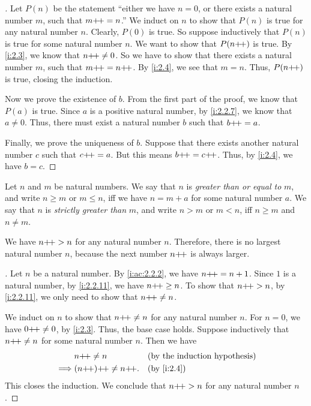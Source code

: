 \begin{proof}[]
  Let \(P(n)\) be the statement ``either we have \(n = 0\), or there exists a natural number \(m\), such that \(m{+}\!{+} = n\).''
  We induct on \(n\) to show that \(P(n)\) is true for any natural number \(n\).
  Clearly, \(P(0)\) is true.
  So suppose inductively that \(P(n)\) is true for some natural number \(n\).
  We want to show that \(P(n{+}\!{+})\) is true.
  By \cref{i:2.3}, we know that \(n{+}\!{+} \neq 0\).
  So we have to show that there exists a natural number \(m\), such that \(m{+}\!{+} = n{+}\!{+}\).
  By \cref{i:2.4}, we see that \(m = n\).
  Thus, \(P(n{+}\!{+})\) is true, closing the induction.

  Now we prove the existence of \(b\).
  From the first part of the proof, we know that \(P(a)\) is true.
  Since \(a\) is a positive natural number, by \cref{i:2.2.7}, we know that \(a \neq 0\).
  Thus, there must exist a natural number \(b\) such that \(b{+}\!{+} = a\).

  Finally, we prove the uniqueness of \(b\).
  Suppose that there exists another natural number \(c\) such that \(c{+}\!{+} = a\).
  But this means \(b{+}\!{+} = c{+}\!{+}\).
  Thus, by \cref{i:2.4}, we have \(b = c\).
\end{proof}

\begin{defn}\label{i:2.2.11}
  Let \(n\) and \(m\) be natural numbers.
  We say that \(n\) is \emph{greater than or equal to} \(m\), and write \(n \geq m\) or \(m \leq n\), iff we have \(n = m + a\) for some natural number \(a\).
  We say that \(n\) is \emph{strictly greater than} \(m\), and write \(n > m\) or \(m < n\), iff \(n \geq m\) and \(n \neq m\).
\end{defn}

\begin{ac}\label{i:ac:2.2.3}
  We have \(n{+}\!{+} > n\) for any natural number \(n\).
  Therefore, there is no largest natural number \(n\), because the next number \(n{+}\!{+}\) is always larger.
\end{ac}

\begin{proof}[]
  Let \(n\) be a natural number.
  By \cref{i:ac:2.2.2}, we have \(n{+}\!{+} = n + 1\).
  Since \(1\) is a natural number, by \cref{i:2.2.11}, we have \(n{+}\!{+} \geq n\).
  To show that \(n{+}\!{+} > n\), by \cref{i:2.2.11}, we only need to show that \(n{+}\!{+} \neq n\).

  We induct on \(n\) to show that \(n{+}\!{+} \neq n\) for any natural number \(n\).
  For \(n = 0\), we have \(0{+}\!{+} \neq 0\), by \cref{i:2.3}.
  Thus, the base case holds.
  Suppose inductively that \(n{+}\!{+} \neq n\) for some natural number \(n\).
  Then we have
  \begin{align*}
             & n\pp \neq n          &  & \byIH      \\
    \implies & (n\pp)\pp \neq n\pp. &  & \by{i:2.4}
  \end{align*}
  This closes the induction.
  We conclude that \(n{+}\!{+} > n\) for any natural number \(n\).
\end{proof}


